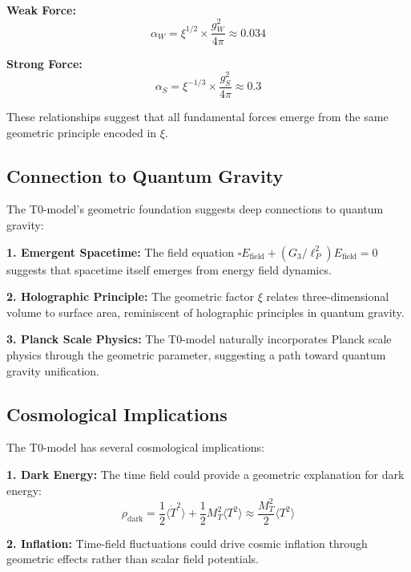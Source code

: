\documentclass[12pt,a4paper]{article}
\newcommand{\xigeom}{\xi}
\begin{document}
	\textbf{Weak Force:}
	\begin{equation}
		\alpha_W = \xigeom^{1/2} \times \frac{g_W^2}{4\pi} \approx 0.034
	\end{equation}
	
	\textbf{Strong Force:}
	\begin{equation}
		\alpha_S = \xigeom^{-1/3} \times \frac{g_S^2}{4\pi} \approx 0.3
	\end{equation}
	
	These relationships suggest that all fundamental forces emerge from the same geometric principle encoded in $\xigeom$.
	
	\subsection{Connection to Quantum Gravity}
	
	The T0-model's geometric foundation suggests deep connections to quantum gravity:
	
	\textbf{1. Emergent Spacetime:}
	The field equation $\square E_{\text{field}} + (G_3/\ell_P^2) E_{\text{field}} = 0$ suggests that spacetime itself emerges from energy field dynamics.
	
	\textbf{2. Holographic Principle:}
	The geometric factor $\xigeom$ relates three-dimensional volume to surface area, reminiscent of holographic principles in quantum gravity.
	
	\textbf{3. Planck Scale Physics:}
	The T0-model naturally incorporates Planck scale physics through the geometric parameter, suggesting a path toward quantum gravity unification.
	
	\subsection{Cosmological Implications}
	
	The T0-model has several cosmological implications:
	
	\textbf{1. Dark Energy:}
	The time field could provide a geometric explanation for dark energy:
	\begin{equation}
		\rho_{\text{dark}} = \frac{1}{2} \langle \dot{T}^2 \rangle + \frac{1}{2} M_T^2 \langle T^2 \rangle \approx \frac{M_T^2}{2} \langle T^2 \rangle
	\end{equation}
	
	\textbf{2. Inflation:}
	Time-field fluctuations could drive cosmic inflation through geometric effects rather than scalar field potentials.
	
\end{document}
